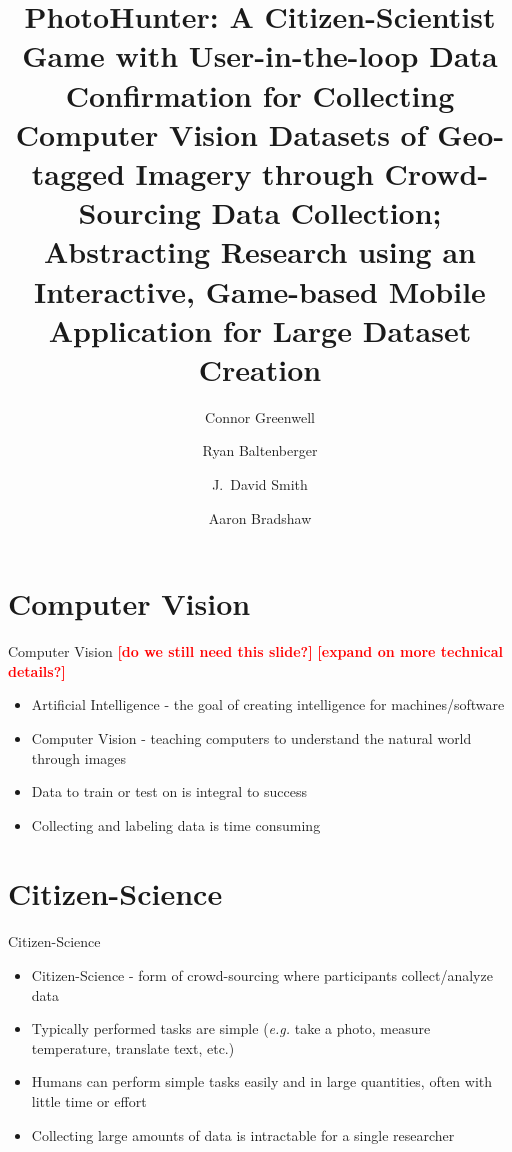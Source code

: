 \documentclass[aspectratio=169]{beamer}
\title[PhotoHunter]{PhotoHunter: A Citizen-Scientist Game with User-in-the-loop
  Data Confirmation for Collecting Computer Vision Datasets of
  Geo-tagged Imagery through Crowd-Sourcing Data Collection;
  Abstracting Research using an Interactive, Game-based Mobile
  Application for Large Dataset Creation}
\author[]{Connor Greenwell \and Ryan Baltenberger
  \and J.\ David Smith \and Aaron Bradshaw}
\institute{QuesoTech.com}
\newcommand{\todo}[1]{\textcolor{red}{\textbf{[#1]}}}
\begin{document}
\maketitle

\section{Computer Vision}

\begin{frame}{Computer Vision}
	\todo{do we still need this slide?}
  \todo{expand on more technical details?}
	\begin{itemize}

    \item Artificial Intelligence - the goal of creating intelligence for
          machines/software

    \item Computer Vision - teaching computers to understand the natural world
          through images

    \item Data to train or test on is integral to success

    \item Collecting and labeling data is time consuming

  \end{itemize}
\end{frame}

\section{Citizen-Science}

\begin{frame}{Citizen-Science}
  \begin{itemize}

    \item Citizen-Science - form of crowd-sourcing where participants
          collect/analyze data

    \item Typically performed tasks are simple (\textit{e.g.} take a photo,
          measure temperature, translate text, etc.)

    \item Humans can perform simple tasks easily and in large quantities,
          often with little time or effort

    \item Collecting large amounts of data is intractable for a single
          researcher

  \end{itemize}
\end{frame}
\end{document}
